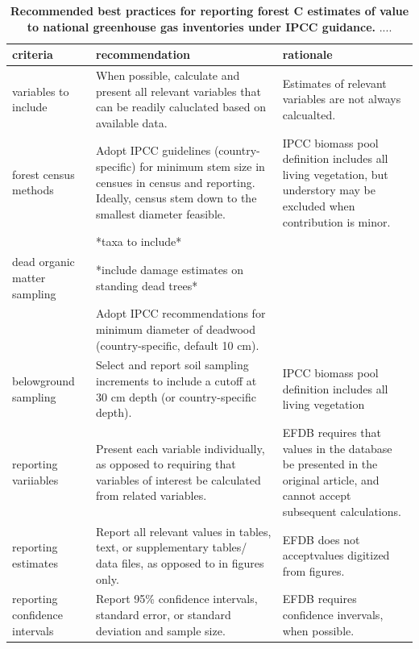 \documentclass[, manuscript]{copernicus}
\begin{document}
\begin{table}

\caption{\label{tab:table_recommendations}\textbf{Recommended best practices for reporting forest C estimates of value to national greenhouse gas inventories under IPCC guidance. } ....}
\centering
\fontsize{10}{12}\selectfont
\begin{tabu} to 
\hline
\textbf{criteria} & \textbf{recommendation} & \textbf{rationale}\\
\hline
variables to include & When possible, calculate and present all relevant variables that can be readily caluclated based on available data. & Estimates of relevant variables are not always calcualted.\\
\hline
forest census methods & Adopt IPCC guidelines (country-specific) for minimum stem size in censues in census and reporting. Ideally, census stem down to the smallest diameter feasible. & IPCC biomass pool definition includes all living vegetation, but understory may be excluded when contribution is minor.\\
\hline
 & *taxa to include* & \\
\hline
dead organic matter sampling & *include damage estimates on standing dead trees* & \\
\hline
 & Adopt IPCC recommendations for minimum diameter of deadwood (country-specific, default 10 cm). & \\
\hline
belowground sampling & Select and report soil sampling increments to include a cutoff at 30 cm depth (or country-specific depth). & IPCC biomass pool definition includes all living vegetation\\
\hline
reporting variiables & Present each variable individually, as opposed to requiring that variables of interest be calculated from related variables. & EFDB requires that values in the database be presented in the original article, and cannot accept subsequent calculations.\\
\hline
reporting estimates & Report all relevant values in tables, text, or supplementary tables/ data files, as opposed to in figures only. & EFDB does not acceptvalues digitized from figures.\\
\hline
reporting confidence intervals & Report 95\% confidence intervals, standard error, or standard deviation and sample size. & EFDB requires confidence invervals, when possible.\\
\hline
\end{tabu}
\end{table}
\end{document}
